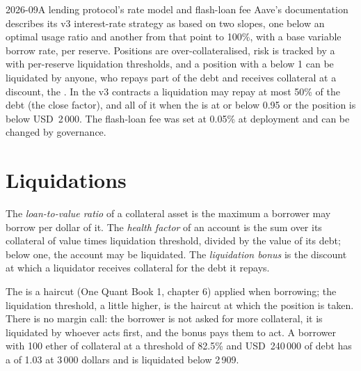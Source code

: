 \begin{dated}{2026-09}{A lending protocol's rate model and flash-loan fee}\label{dat:m3:defi-credit-and-leverage:aave}
Aave's documentation describes its v3 interest-rate strategy as based on two slopes, one below an optimal usage ratio and another from
that point to 100\%, with a base variable borrow rate, per reserve. Positions are over-collateralised, risk is tracked by a 
with per-reserve liquidation thresholds, and a position with a  below 1 can be liquidated by anyone, who repays part of the
debt and receives collateral at a discount, the . In the v3 contracts a liquidation may repay at most 50\% of the debt
(the close factor), and all of it when the  is at or below 0.95 or the position is below USD~2\,000. The flash-loan fee was set at 0.05\%
at deployment and can be changed by governance.
\end{dated}

\section{Liquidations}

\begin{definition}\label{def:m3:defi-credit-and-leverage:ltv}
The \emph{loan-to-value ratio} of a collateral asset is the maximum a borrower may borrow per dollar of it. The
\emph{health factor} of an account is the sum over its collateral of value times liquidation threshold, divided by the
value of its debt; below one, the account may be liquidated. The \emph{liquidation bonus} is the discount at which a
liquidator receives collateral for the debt it repays.
\end{definition}

The  is a haircut (One Quant Book 1, chapter 6) applied when borrowing; the liquidation threshold, a little higher, is the
haircut at which the position is taken. There is no margin call: the borrower is not asked for more collateral, it is liquidated by whoever
acts first, and the bonus pays them to act. A borrower with 100 ether of collateral at a threshold of 82.5\% and USD~240\,000 of debt has a
 of 1.03 at 3\,000 dollars and is liquidated below 2\,909.

